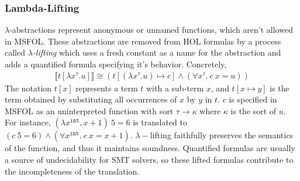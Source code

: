 \documentclass{article}
\begin{document}
	\subsubsection{Lambda-Lifting}
		$\lambda$-abstractions represent 
		anonymous or unnamed functions, 
		which aren't allowed in MSFOL.
		These abstractions are removed
		from HOL formulas by a process 
		called \textit{$\lambda$-lifting}
		which uses a fresh constant as a
		name for the abstraction and adds 
		a quantified formula specifying 
		it's behavior. Concretely,
		\begin{align*}
			\llbracket t[\lambda x^{\tau}.u]
			\rrbracket \cong 
			(t[(\lambda x^{\tau}.u) \mapsto c]
			\land (\forall x^{\tau}.\ c\ x = u))
		\end{align*}
		The notation $t[x]$ represents a 
		term $t$ with a sub-term $x$, 
		and $t[x \mapsto y]$ is the 
		term obtained by substituting all 
		occurrences of $x$ by $y$ in $t$.
		$c$ is specified in MSFOL as an 
		uninterpreted function with sort 
		$\tau \to \kappa$ where $\kappa$ 
		is the sort of $u$. For instance, 
		$(\lambda x^{\texttt{int}}, x + 1)\ 
		5 = 6$
		is translated to $(c\ 5 = 6) \land
		(\forall x^{\texttt{int}}.\ 
		c\ x = x + 1)$. $\lambda-$lifting
		faithfully preserves the 
		semantics of the function, and 
		thus it maintains soundness. 
		Quantified formulas are usually a 
		source of undecidability for SMT 
		solvers, so these lifted formulas 
		contribute to the incompleteness
		of the translation.
		
\end{document}
